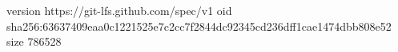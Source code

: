 version https://git-lfs.github.com/spec/v1
oid sha256:63637409eaa0c1221525e7c2cc7f2844dc92345cd236dff1cae1474dbb808e52
size 786528
